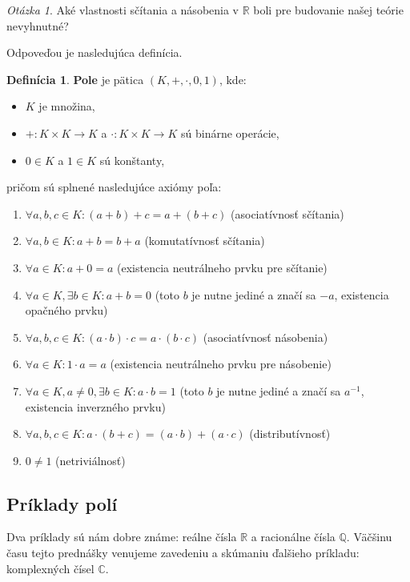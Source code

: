 \documentclass[11pt,a4paper]{article}
\theoremstyle{definition}
\newtheorem{definicia}{Definícia}[section]
\theoremstyle{plain}
\theoremstyle{remark}
\newtheorem*{question}{Otázka}
\newcommand{\R}{\mathbb{R}}
\begin{document}
\begin{question}
Aké vlastnosti sčítania a násobenia v $\R$ boli pre budovanie našej teórie nevyhnutné?
\end{question}
Odpoveďou je nasledujúca definícia.

\begin{definicia}
\textbf{Pole} je pätica $(K, +, \cdot, 0, 1)$, kde:
\begin{itemize}
    \item $K$ je množina,
    \item $+: K \times K \to K$ a $\cdot: K \times K \to K$ sú binárne operácie,
    \item $0 \in K$ a $1 \in K$ sú konštanty,
\end{itemize}
pričom sú splnené nasledujúce axiómy poľa:
\begin{enumerate}
    \item $\forall a,b,c \in K: (a+b)+c = a+(b+c)$ (asociatívnosť sčítania)
    \item $\forall a,b \in K: a+b = b+a$ (komutatívnosť sčítania)
    \item $\forall a \in K: a+0 = a$ (existencia neutrálneho prvku pre sčítanie)
    \item $\forall a \in K, \exists b \in K: a+b=0$ (toto $b$ je nutne jediné a značí sa $-a$, existencia opačného prvku)
    \item $\forall a,b,c \in K: (a \cdot b) \cdot c = a \cdot (b \cdot c)$ (asociatívnosť násobenia)
    \item $\forall a \in K: 1 \cdot a = a$ (existencia neutrálneho prvku pre násobenie)
    \item $\forall a \in K, a \neq 0, \exists b \in K: a \cdot b = 1$ (toto $b$ je nutne jediné a značí sa $a^{-1}$, existencia inverzného prvku)
    \item $\forall a,b,c \in K: a \cdot (b+c) = (a \cdot b) + (a \cdot c)$ (distributívnosť)
    \item $0 \neq 1$ (netriviálnosť)
\end{enumerate}
\end{definicia}

\subsection{Príklady polí}
Dva príklady sú nám dobre známe: reálne čísla $\R$ a racionálne čísla $\mathbb{Q}$. Väčšinu času tejto prednášky venujeme zavedeniu a skúmaniu ďalšieho príkladu: komplexných čísel $\mathbb{C}$.
\end{document}
